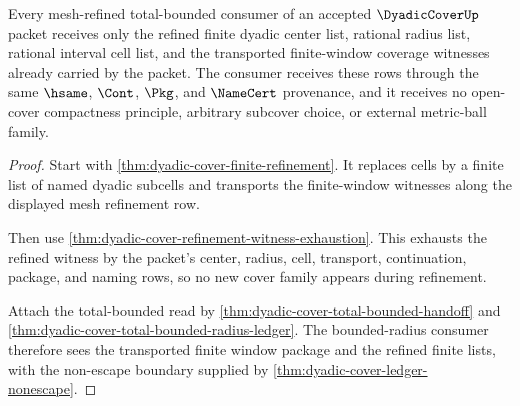 \begin{theorem}
\label{thm:dyadic-cover-refined-window-total-bounded-package}
Every mesh-refined total-bounded consumer of an accepted $\DyadicCoverUp$
packet receives only the refined finite dyadic center list, rational radius
list, rational interval cell list, and the transported finite-window coverage
witnesses already carried by the packet. The consumer receives these rows
through the same $\hsame$, $\Cont$, $\Pkg$, and $\NameCert$ provenance, and it
receives no open-cover compactness principle, arbitrary subcover choice, or
external metric-ball family.
\end{theorem}
\begin{proof}
Start with \autoref{thm:dyadic-cover-finite-refinement}. It replaces cells by
a finite list of named dyadic subcells and transports the finite-window
witnesses along the displayed mesh refinement row.

Then use \autoref{thm:dyadic-cover-refinement-witness-exhaustion}. This
exhausts the refined witness by the packet's center, radius, cell, transport,
continuation, package, and naming rows, so no new cover family appears during
refinement.

Attach the total-bounded read by
\autoref{thm:dyadic-cover-total-bounded-handoff} and
\autoref{thm:dyadic-cover-total-bounded-radius-ledger}. The bounded-radius
consumer therefore sees the transported finite window package and the refined
finite lists, with the non-escape boundary supplied by
\autoref{thm:dyadic-cover-ledger-nonescape}.
\end{proof}

